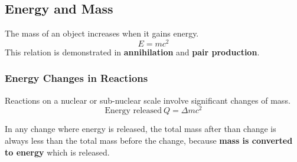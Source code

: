 \subsection{Energy and Mass}

The mass of an object increases when it gains energy.
$$E=mc^2$$
This relation is demonstrated in \textbf{annihilation} and \textbf{pair production}.

\subsubsection*{Energy Changes in Reactions}

Reactions on a nuclear or sub-nuclear scale involve significant changes of mass.
$$\text{Energy released}\ Q=\Delta mc^2$$

In any change where energy is released, the total mass after than change is always less than the total mass before the change, because \textbf{mass is converted to energy} which is released.
